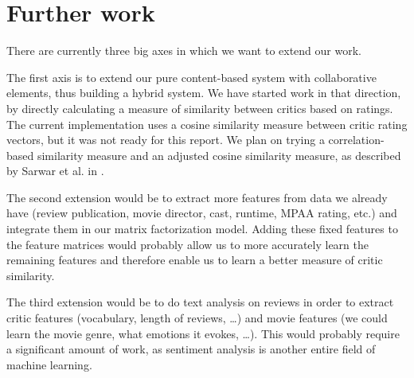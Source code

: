 \documentclass[12pt]{article}
\begin{document}
\section{Further work}

There are currently three big axes in which we want to extend our work.

The first axis is to extend our pure content-based system with collaborative elements, thus building a hybrid system. We have started work in that direction, by directly calculating a measure of similarity between critics based on ratings. The current implementation uses a cosine similarity measure between critic rating vectors, but it was not ready for this report. We plan on trying a correlation-based similarity measure and an adjusted cosine similarity measure, as described by Sarwar et al. in \cite{Sarwar01}.

The second extension would be to extract more features from data we already have (review publication, movie director, cast, runtime, MPAA rating, etc.) and integrate them in our matrix factorization model. Adding these fixed features to the feature matrices would probably allow us to more accurately learn the remaining features and therefore enable us to learn a better measure of critic similarity.

The third extension would be to do text analysis on reviews in order to extract critic features (vocabulary, length of reviews, \dots) and movie features (we could learn the movie genre, what emotions it evokes, \dots). This would probably require a significant amount of work, as sentiment analysis is another entire field of machine learning.

{}

\end{document}
